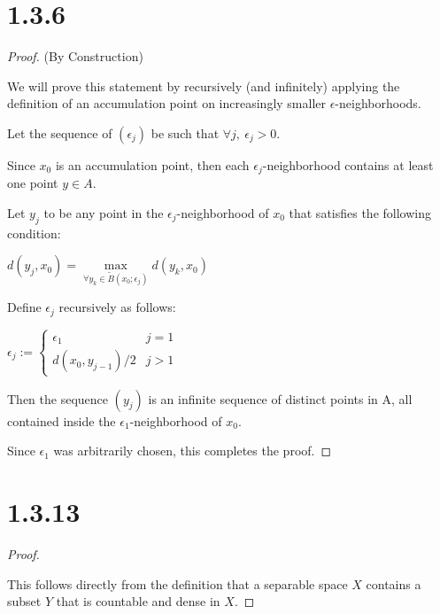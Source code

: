 \documentclass{article}
\begin{document}
\section*{1.3.6}

\begin{proof}(By Construction)
  $ $

  We will prove this statement by recursively (and infinitely) applying the definition of an accumulation point on increasingly smaller $\epsilon$-neighborhoods.
  \newline

  Let the sequence of $(\epsilon_j)$ be such that $\forall j, \: \epsilon_j > 0$.
  \newline

  Since $x_0$ is an accumulation point,
  then each $\epsilon_j$-neighborhood contains at least one point $y \in A$.
  \newline
  
  Let $y_j$ to be any point in the $\epsilon_j$-neighborhood of $x_0$ that satisfies the following condition:
  \begin{center}
    $d(y_j, x_0) = \max\limits_{\forall y_k \in \tilde{B}(x_0; \epsilon_j)} d(y_k, x_0)$
  \end{center}

  Define $\epsilon_j$ recursively as follows:
  
  \begin{center}
    $\epsilon_j := \begin{cases}
      \epsilon_1 & j = 1 \\
      d(x_0, y_{j-1})/2 & j > 1
    \end{cases}$
  \end{center}

  Then the sequence $(y_j)$ is an infinite sequence of distinct points in A, all contained inside the $\epsilon_1$-neighborhood of $x_0$. 
  \newline
  
  Since $\epsilon_1$ was arbitrarily chosen, this completes the proof.

\end{proof}

\section*{1.3.13}
\begin{proof}
  $ $

  This follows directly from the definition that a separable space $X$ contains a subset $Y$ that is countable and dense in $X$.

\end{proof}
\end{document}

